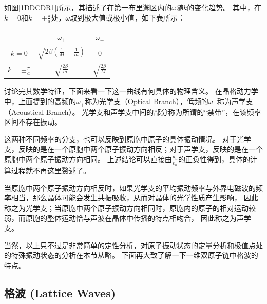 \documentclass[declarePage]{ecnuthesis}
\begin{document}
如图\ref{1DDCDR1}所示，其描述了在第一布里渊区内的$\omega$随$k$的变化趋势。%
其中，在$k=0$和$k=\pm\frac{\pi}{a}$处，$\omega$取到极大值或极小值，如下表所示：
\begin{table}[htb]
    \centering
    \label{DRT}
    \begin{tabular}{|c|c|c|}
        \hline
                             & $\omega_+$                               & $\omega_-$                \\ 
        \hline
        $k=0$                & $\sqrt{2\beta(\frac{1}{M}+\frac{1}{m})}$ & $0$                       \\ 
        \hline
        $k=\pm\frac{\pi}{a}$ & $\sqrt{\frac{2\beta}{m}}$                & $\sqrt{\frac{2\beta}{M}}$ \\ 
        \hline
    \end{tabular}
\end{table}

讨论完其数学特征，下面来看一下这一曲线有何具体的物理含义。%
在晶格动力学中，上面提到的高频的$\omega_+$称为光学支（Optical Branch），低频的$\omega_-$称为声学支（Acoustical Branch）。%
光学支和声学支中间的部分称为所谓的“禁带”，在该频率区间不存在振动。

这两种不同频率的分支，也可以反映到原胞中原子的具体振动情况。%
对于光学支，反映的是在一个原胞中两个原子振动方向相反；对于声学支，反映的是在一个原胞中两个原子振动方向相同。%
上述结论可以直接由$\frac{u_n}{v_n}$的正负性得到，具体的计算过程就不再这里赘述了。

当原胞中两个原子振动方向相反时，如果光学支的平均振动频率与外界电磁波的频率相当，那么晶体可能会发生共振吸收，从而对晶体的光学性质产生影响，%
因此称之为光学支；当原胞中两个原子振动方向相同时，原胞内的原子的相对运动较弱，而原胞的整体运动恰与声波在晶体中传播的特点相吻合，%
因此称之为声学支。

当然，以上只不过是非常简单的定性分析，对原子振动状态的定量分析和极值点处的特殊振动状态的分析在本节从略。%
下面再大致了解一下一维双原子链中格波的特点。

\subsection{格波 (Lattice Waves)}
\end{document}
